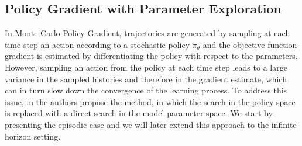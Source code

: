 \subsection{Policy Gradient with Parameter Exploration}
In Monte Carlo Policy Gradient, trajectories are generated by sampling at each
time step an action according to a stochastic policy $\pi_\theta$ and the
objective function gradient is estimated by differentiating the policy with
respect to the parameters. However, sampling an action from the policy at each
time step leads to a large variance in the sampled histories and therefore in 
the gradient estimate, which can in turn slow down the convergence of the
learning process. To address this issue, in \cite{sehnke2008policy} the authors
propose the 
method, in which the search in the policy space is replaced with a direct
search in the model parameter space. We start by presenting the episodic case
and we will later extend this approach to the infinite horizon setting.  

